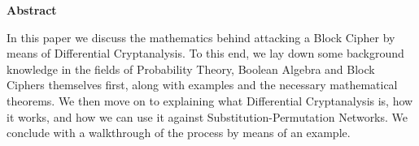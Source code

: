 
\begin{center}
\Large \bf Abstract
\end{center}

In this paper we discuss the mathematics behind attacking a Block Cipher by
means of Differential Cryptanalysis. To this end, we lay down some background
knowledge in the fields of Probability Theory, Boolean Algebra and Block
Ciphers themselves first, along with examples and the necessary mathematical
theorems. We then move on to explaining what Differential Cryptanalysis is, how
it works, and how we can use it against Substitution-Permutation Networks. We
conclude with a walkthrough of the process by means of an example. 

